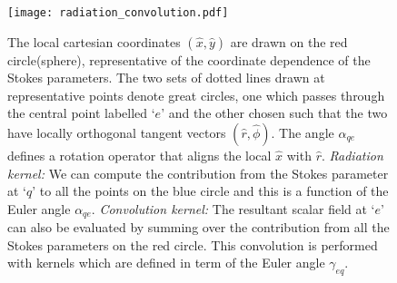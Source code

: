 %
\begin{figure}[!t]
\centering
\texttt{[image: radiation\_convolution.pdf]}
\caption{The local cartesian coordinates $(\hat{x},\hat{y})$ are drawn on the red circle(sphere), representative of the coordinate dependence of the Stokes parameters. The two sets of dotted lines drawn at representative points denote great circles, one which passes through the central point labelled `$e$' and the other chosen such that the two have locally orthogonal tangent vectors $(\hat{r},\hat{\phi})$. The angle $\alpha_{qe}$ defines a rotation operator that aligns the local $\hat{x}$ with $\hat{r}$.   \textit{Radiation kernel:} We can compute the contribution from the Stokes parameter at `$q$' to all the points on the blue circle and this is a function of the Euler angle $\alpha_{qe}$. \textit{Convolution kernel:} The resultant scalar field at `$e$' can also be evaluated by summing over the contribution from all the Stokes parameters on the red circle. This convolution is performed with kernels which are defined in term of the Euler angle $\gamma_{eq}$.}
\label{fig:planar_euler_angles}
\end{figure}
%

